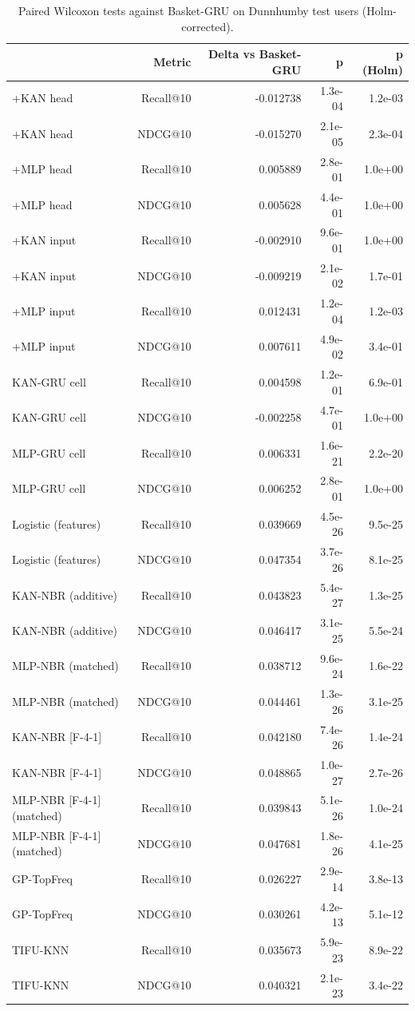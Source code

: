 \begin{table}[H]
\centering\small
\caption{Paired Wilcoxon tests against Basket-GRU on Dunnhumby test users (Holm-corrected).}
\label{tab:sig_dunnhumby}
\begin{tabular}{lrrrr}
\toprule
 & Metric & Delta vs Basket-GRU & p & p (Holm) \\
\midrule
+KAN head & Recall@10 & -0.012738 & 1.3e-04 & 1.2e-03 \\
+KAN head & NDCG@10 & -0.015270 & 2.1e-05 & 2.3e-04 \\
+MLP head & Recall@10 & 0.005889 & 2.8e-01 & 1.0e+00 \\
+MLP head & NDCG@10 & 0.005628 & 4.4e-01 & 1.0e+00 \\
+KAN input & Recall@10 & -0.002910 & 9.6e-01 & 1.0e+00 \\
+KAN input & NDCG@10 & -0.009219 & 2.1e-02 & 1.7e-01 \\
+MLP input & Recall@10 & 0.012431 & 1.2e-04 & 1.2e-03 \\
+MLP input & NDCG@10 & 0.007611 & 4.9e-02 & 3.4e-01 \\
KAN-GRU cell & Recall@10 & 0.004598 & 1.2e-01 & 6.9e-01 \\
KAN-GRU cell & NDCG@10 & -0.002258 & 4.7e-01 & 1.0e+00 \\
MLP-GRU cell & Recall@10 & 0.006331 & 1.6e-21 & 2.2e-20 \\
MLP-GRU cell & NDCG@10 & 0.006252 & 2.8e-01 & 1.0e+00 \\
Logistic (features) & Recall@10 & 0.039669 & 4.5e-26 & 9.5e-25 \\
Logistic (features) & NDCG@10 & 0.047354 & 3.7e-26 & 8.1e-25 \\
KAN-NBR (additive) & Recall@10 & 0.043823 & 5.4e-27 & 1.3e-25 \\
KAN-NBR (additive) & NDCG@10 & 0.046417 & 3.1e-25 & 5.5e-24 \\
MLP-NBR (matched) & Recall@10 & 0.038712 & 9.6e-24 & 1.6e-22 \\
MLP-NBR (matched) & NDCG@10 & 0.044461 & 1.3e-26 & 3.1e-25 \\
KAN-NBR [F-4-1] & Recall@10 & 0.042180 & 7.4e-26 & 1.4e-24 \\
KAN-NBR [F-4-1] & NDCG@10 & 0.048865 & 1.0e-27 & 2.7e-26 \\
MLP-NBR [F-4-1] (matched) & Recall@10 & 0.039843 & 5.1e-26 & 1.0e-24 \\
MLP-NBR [F-4-1] (matched) & NDCG@10 & 0.047681 & 1.8e-26 & 4.1e-25 \\
GP-TopFreq & Recall@10 & 0.026227 & 2.9e-14 & 3.8e-13 \\
GP-TopFreq & NDCG@10 & 0.030261 & 4.2e-13 & 5.1e-12 \\
TIFU-KNN & Recall@10 & 0.035673 & 5.9e-23 & 8.9e-22 \\
TIFU-KNN & NDCG@10 & 0.040321 & 2.1e-23 & 3.4e-22 \\
\bottomrule
\end{tabular}
\end{table}
